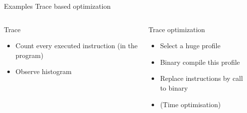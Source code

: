 %
\begin{Frame}{Examples Trace based optimization}
  \begin{columns}[t]
    \begin{column}{\BW} %
      \begin{block}{Trace}
        \begin{itemize}
        \item Count every executed instruction (in the program)
        \item Observe histogram
        \end{itemize}
      \end{block} 
    \end{column}
    
    \begin{column}{\BW} %
      \begin{block}{Trace optimization}
        \begin{itemize}
        \item Select a huge profile
        \item Binary compile this profile
        \item Replace instructions by call to binary          
        \item (Time optimisation)
        \end{itemize}
      \end{block}   
    \end{column}
  \end{columns}  
\end{Frame}


